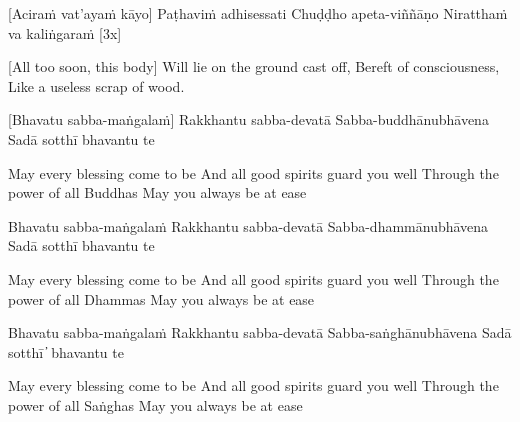 \suttaRef{[Thai]}

[Aciraṁ vat’ayaṁ kāyo]
Paṭhaviṁ adhisessati
Chuḍḍho apeta-viññāṇo
Niratthaṁ va kaliṅgaraṁ [3x]

\begin{english}
  [All too soon, this body]
  Will lie on the ground cast off,
  Bereft of consciousness,
  Like a useless scrap of wood.
\end{english}

\suttaRef{[Dhp 41]}

[Bhavatu sabba-maṅgalaṁ]
Rakkhantu sabba-devatā
Sabba-buddhānubhāvena
Sadā sotthī bhavantu te

\begin{english}
May every blessing come to be
And all good spirits guard you well
Through the power of all Buddhas
May you always be at ease
\end{english}

Bhavatu sabba-maṅgalaṁ
Rakkhantu sabba-devatā
Sabba-dhammānubhāvena
Sadā sotthī bhavantu te

\begin{english}
May every blessing come to be
And all good spirits guard you well
Through the power of all Dhammas
May you always be at ease
\end{english}

Bhavatu sabba-maṅgalaṁ
Rakkhantu sabba-devatā
Sabba-saṅghānubhāvena
Sadā sotthī  ̓  bhavantu te

\begin{english}
May every blessing come to be
And all good spirits guard you well
Through the power of all Saṅghas
May you always be at ease
\end{english}
